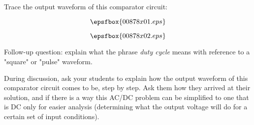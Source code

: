 

Trace the output waveform of this comparator circuit:

$$\epsfbox{00878x01.eps}$$







$$\epsfbox{00878x02.eps}$$

\vskip 10pt

Follow-up question: explain what the phrase {\it duty cycle} means with reference to a "square" or "pulse" waveform.







During discussion, ask your students to explain how the output waveform of this comparator circuit comes to be, step by step.  Ask them how they arrived at their solution, and if there is a way this AC/DC problem can be simplified to one that is DC only for easier analysis (determining what the output voltage will do for a certain set of input conditions).




